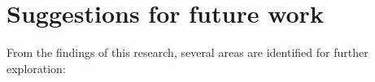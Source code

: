 %

\section{Suggestions for future work}

From the findings of this research, several areas are identified for further exploration:

